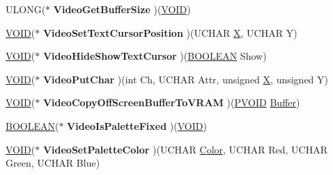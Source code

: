 \begin{DoxyCompactItemize}
\mbox{\label{structtag_m_a_c_h_v_t_b_l_a9044086b63d26145b077898cd614d0a8}} 
U\+L\+O\+NG($\ast$ {\bfseries Video\+Get\+Buffer\+Size} )(\hyperlink{interfacevoid}{V\+O\+ID})
\item 
\mbox{\label{structtag_m_a_c_h_v_t_b_l_a861ae960298770e1f7af200c175eebb3}} 
\hyperlink{interfacevoid}{V\+O\+ID}($\ast$ {\bfseries Video\+Set\+Text\+Cursor\+Position} )(U\+C\+H\+AR \hyperlink{class_x}{X}, U\+C\+H\+AR Y)
\item 
\mbox{\label{structtag_m_a_c_h_v_t_b_l_a4fb5ad7bce8f7b7dc0b6d6b68f46516e}} 
\hyperlink{interfacevoid}{V\+O\+ID}($\ast$ {\bfseries Video\+Hide\+Show\+Text\+Cursor} )(\hyperlink{_processor_bind_8h_a112e3146cb38b6ee95e64d85842e380a}{B\+O\+O\+L\+E\+AN} Show)
\item 
\mbox{\label{structtag_m_a_c_h_v_t_b_l_a96e231505c78724618a8e9a49ae0019c}} 
\hyperlink{interfacevoid}{V\+O\+ID}($\ast$ {\bfseries Video\+Put\+Char} )(int Ch, U\+C\+H\+AR Attr, unsigned \hyperlink{class_x}{X}, unsigned Y)
\item 
\mbox{\label{structtag_m_a_c_h_v_t_b_l_a47f77eb3086317cb99acb6c98f48e8bc}} 
\hyperlink{interfacevoid}{V\+O\+ID}($\ast$ {\bfseries Video\+Copy\+Off\+Screen\+Buffer\+To\+V\+R\+AM} )(\hyperlink{interfacevoid}{P\+V\+O\+ID} \hyperlink{class_buffer}{Buffer})
\item 
\mbox{\label{structtag_m_a_c_h_v_t_b_l_ac117be396ca4119d288ae5c4e8c97d0d}} 
\hyperlink{_processor_bind_8h_a112e3146cb38b6ee95e64d85842e380a}{B\+O\+O\+L\+E\+AN}($\ast$ {\bfseries Video\+Is\+Palette\+Fixed} )(\hyperlink{interfacevoid}{V\+O\+ID})
\item 
\mbox{\label{structtag_m_a_c_h_v_t_b_l_a31ecc56c496b895fd589b8babf656f60}} 
\hyperlink{interfacevoid}{V\+O\+ID}($\ast$ {\bfseries Video\+Set\+Palette\+Color} )(U\+C\+H\+AR \hyperlink{struct_color}{Color}, U\+C\+H\+AR Red, U\+C\+H\+AR Green, U\+C\+H\+AR Blue)
\item 
\mbox{\label{structtag_m_a_c_h_v_t_b_l_a032de4a57e3b150233f7329c3a12d9c2}} 

\end{DoxyCompactItemize}
